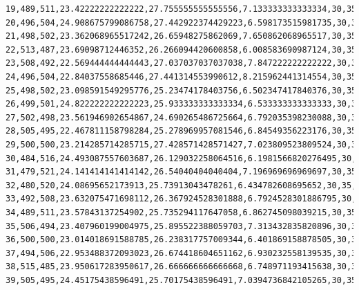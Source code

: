 \documentclass[authoryearcitations]{UoYCSproject}
\begin{document}
\begin{landscape}
\begin{verbatim}
19,489,511,23.42222222222222,27.755555555555556,7.133333333333334,30,35,317,163,104,65,32,68,46,50,48,29,29,21,14,5,3,4,2,0,0
20,496,504,24.908675799086758,27.442922374429223,6.598173515981735,30,35,306,192,87,67,46,33,68,40,46,34,29,24,14,8,3,1,2,0,0
21,498,502,23.362068965517242,26.65948275862069,7.650862068965517,30,35,317,197,87,56,63,44,34,58,35,32,23,24,14,10,4,0,2,0,0
22,513,487,23.69098712446352,26.266094420600858,6.008583690987124,30,35,329,179,107,56,46,60,42,36,46,24,28,17,15,6,8,1,0,0,0
23,508,492,22.569444444444443,27.037037037037038,7.847222222222222,30,35,300,209,104,69,47,41,54,41,33,35,19,21,17,6,3,1,0,0,0
24,496,504,22.84037558685446,27.441314553990612,8.215962441314554,30,35,296,196,95,86,62,43,42,43,38,25,27,16,16,7,7,0,1,0,0
25,498,502,23.098591549295776,25.23474178403756,6.502347417840376,30,35,295,183,110,67,76,64,35,39,30,26,24,18,16,10,3,4,0,0,0
26,499,501,24.822222222222223,25.933333333333334,6.533333333333333,30,35,301,199,94,72,52,66,53,39,33,19,24,20,12,10,2,4,0,0,0
27,502,498,23.561946902654867,24.690265486725664,6.792035398230088,30,35,316,175,104,79,57,43,64,43,36,19,16,15,11,11,8,3,0,0,0
28,505,495,22.467811158798284,25.278969957081546,6.84549356223176,30,35,324,191,84,63,72,47,43,49,36,30,17,14,9,7,11,2,1,0,0
29,500,500,23.214285714285715,27.428571428571427,7.023809523809524,30,35,299,197,101,57,65,68,41,42,40,31,20,10,10,6,6,6,0,1,0
30,484,516,24.493087557603687,26.129032258064516,6.1981566820276495,30,35,307,173,106,67,50,64,64,34,36,30,31,13,8,7,5,3,1,1,0
31,479,521,24.141414141414142,26.54040404040404,7.196969696969697,30,35,283,180,107,68,67,46,57,60,24,33,28,24,9,6,4,4,0,0,0
32,480,520,24.08695652173913,25.73913043478261,6.434782608695652,30,35,315,164,99,67,62,56,49,41,49,26,22,23,15,6,2,4,0,0,0
33,492,508,23.632075471698112,26.367924528301888,6.7924528301886795,30,35,298,188,90,72,58,57,49,44,37,41,17,19,19,6,1,3,1,0,0
34,489,511,23.57843137254902,25.735294117647058,6.862745098039215,30,35,291,178,91,73,64,57,58,37,47,32,27,9,21,8,3,3,0,1,0
35,506,494,23.407960199004975,25.895522388059703,7.313432835820896,30,35,280,179,98,74,62,64,53,42,32,35,29,22,10,16,2,1,1,0,0
36,500,500,23.014018691588785,26.238317757009344,6.401869158878505,30,35,292,179,81,76,69,55,57,44,35,25,29,22,19,8,7,1,0,1,0
37,494,506,22.953488372093023,26.674418604651162,6.930232558139535,30,35,295,181,101,45,68,65,55,47,36,32,19,23,12,12,4,5,0,0,0
38,515,485,23.950617283950617,26.666666666666668,6.748971193415638,30,35,334,170,91,55,40,64,60,50,32,35,19,13,18,8,7,3,1,0,0
39,505,495,24.45175438596491,25.70175438596491,7.0394736842105265,30,35,330,180,88,56,51,46,53,49,38,33,26,15,12,11,8,3,0,1,0

\end{verbatim}
\end{landscape}
\end{document}
